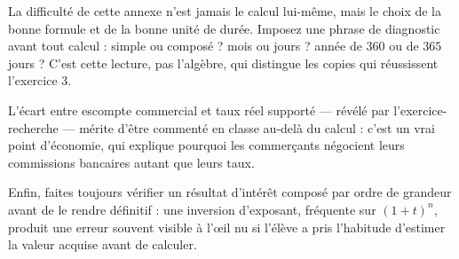 \begin{notepourlaclasse}
La difficulté de cette annexe n'est jamais le calcul lui-même, mais le choix
de la bonne formule et de la bonne unité de durée. Imposez une phrase de
diagnostic avant tout calcul : simple ou composé ? mois ou jours ? année de
$360$ ou de $365$ jours ? C'est cette lecture, pas l'algèbre, qui distingue
les copies qui réussissent l'exercice 3.

L'écart entre escompte commercial et taux réel supporté — révélé par
l'exercice-recherche — mérite d'être commenté en classe au-delà du calcul :
c'est un vrai point d'économie, qui explique pourquoi les commerçants
négocient leurs commissions bancaires autant que leurs taux.

Enfin, faites toujours vérifier un résultat d'intérêt composé par ordre de
grandeur avant de le rendre définitif : une inversion d'exposant, fréquente
sur $(1+t)^{n}$, produit une erreur souvent visible à l'œil nu si l'élève a
pris l'habitude d'estimer la valeur acquise avant de calculer.
\end{notepourlaclasse}
